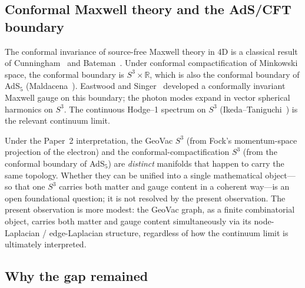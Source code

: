 \documentclass[aps,pra,twocolumn,superscriptaddress,longbibliography]{revtex4-2}
\begin{document}
\subsection{Conformal Maxwell theory and the AdS/CFT boundary}

The conformal invariance of source-free Maxwell theory in 4D is a
classical result of Cunningham~\cite{Cunningham1909} and
Bateman~\cite{Bateman1910}.  Under conformal compactification of
Minkowski space, the conformal boundary is $S^3 \times \mathbb{R}$,
which is also the conformal boundary of AdS$_5$
(Maldacena~\cite{Maldacena1998}).  Eastwood and
Singer~\cite{EastwoodSinger1985} developed a conformally invariant
Maxwell gauge on this boundary; the photon modes expand in vector
spherical harmonics on $S^3$.  The continuous Hodge--1 spectrum on
$S^3$ (Ikeda--Taniguchi~\cite{IkedaTaniguchi1978}) is the relevant
continuum limit.

Under the Paper~2 interpretation, the GeoVac $S^3$ (from Fock's
momentum-space projection of the electron) and the
conformal-compactification $S^3$ (from the conformal boundary of
AdS$_5$) are \emph{distinct} manifolds that happen to carry the same
topology.  Whether they can be unified into a single mathematical
object---so that one $S^3$ carries both matter and gauge content in
a coherent way---is an open foundational question; it is not
resolved by the present observation.  The present observation is
more modest: the GeoVac graph, as a finite combinatorial object,
carries both matter and gauge content simultaneously via its
node-Laplacian / edge-Laplacian structure, regardless of how the
continuum limit is ultimately interpreted.

\subsection{Why the gap remained}
\end{document}
